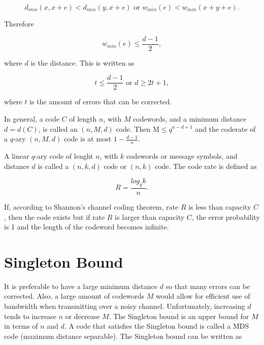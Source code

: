 \documentclass[../main.tex]{subfiles}
\begin{document}
    \begin{equation*}
        d_{min}(x, x+e) < d_{min}(y, x+e) \text{ or } w_{min}(e) < w_{min}(x+y+e).
    \end{equation*}

    \noindent
    Therefore

    \begin{equation*}
         w_{min}(e) \leq \frac{d-1}{2},
    \end{equation*}

    \noindent
    where $d$ is the distance. This is written as

    \begin{equation*}
        t \leq \frac{d-1}{2} \text{ or } d \geq 2t+1,
    \end{equation*}

    \noindent
    where $t$ is the amount of errors that can be corrected.

    In general, a code $C$ of length $n$, with $M$ codewords, and a minimum distance $d=d(C)$, is called an $(n,M,d)$ code. Then M$ \leq q^{n-d+1}$ and the coderate of a $q$-ary $(n,M,d)$ code is at most $1-\frac{d-1}{n}$.

    A linear $q$-ary code of lenght $n$, with $k$ codewords or message symbols, and distance $d$ is called a $(n,k,d)$ code or $(n,k)$ code. The code rate is defined as

    \begin{equation*}
        R=\frac{log_qk}{n}.
    \end{equation*}

    \noindent
    If, according to Shannon's channel coding theorem, rate $R$ is less than capacity $C$, then the code exists but if rate $R$ is larger than capacity $C$, the error probability is 1 and the length of the codeword becomes infinite.


    \section{Singleton Bound}

    It is preferable to have a large minimum distance $d$ so that many errors can be corrected. Also, a large amount of codewords $M$ would allow for efficient use of bandwidth when transmitting over a noisy channel. Unfortunately, increasing $d$ tends to increase $n$ or decrease $M$. The Singleton bound is an upper bound for $M$ in terms of $n$ and $d$. A code that satisfies the Singleton bound is called a MDS code (maximum distance separable). The Singleton bound can be written as
\end{document}
